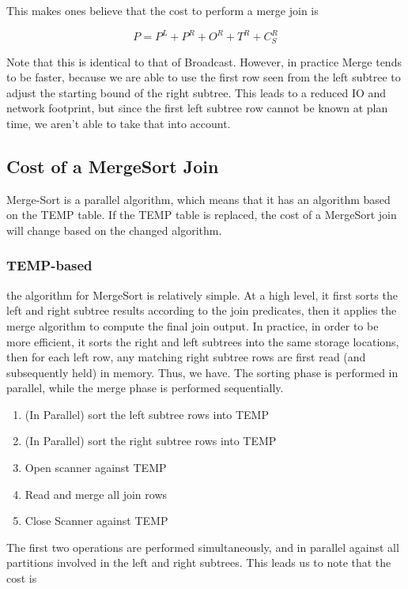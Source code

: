 \documentclass[10pt]{amsart}
\begin{document}
This makes ones believe that the cost to perform a merge join is

\begin{equation}
P = P^L + P^R+O^R+T^R+C_S^R
\end{equation}

Note that this is identical to that of Broadcast. However, in practice Merge tends to be faster, because we are able to use the first row seen from the left subtree to adjust the starting bound of the right subtree. This leads to a reduced IO and network footprint, but since the first left subtree row cannot be known at plan time, we aren't able to take that into account.

\subsection{Cost of a MergeSort Join}
Merge-Sort is a parallel algorithm, which means that it has an algorithm based on the TEMP table. If the TEMP table is replaced, the cost of a MergeSort join will change based on the changed algorithm.

\subsubsection{TEMP-based}
the algorithm for MergeSort is relatively simple. At a high level, it first sorts the left and right subtree results according to the join predicates, then it applies the merge algorithm to compute the final join output. In practice, in order to be more efficient, it sorts the right and left subtrees into the same storage locations, then for each left row, any matching right subtree rows are first read (and subsequently held) in memory. Thus, we have. The sorting phase is performed in parallel, while the merge phase is performed sequentially.

\begin{enumerate}
				\item (In Parallel) sort the left subtree rows into TEMP
				\item (In Parallel) sort the right subtree rows into TEMP
				\item Open scanner against TEMP
				\item Read and merge all join rows
				\item Close Scanner against TEMP
\end{enumerate}

The first two operations are performed simultaneously, and in parallel against all partitions involved in the left and right subtrees. This leads us to note that the cost is
\end{document}
